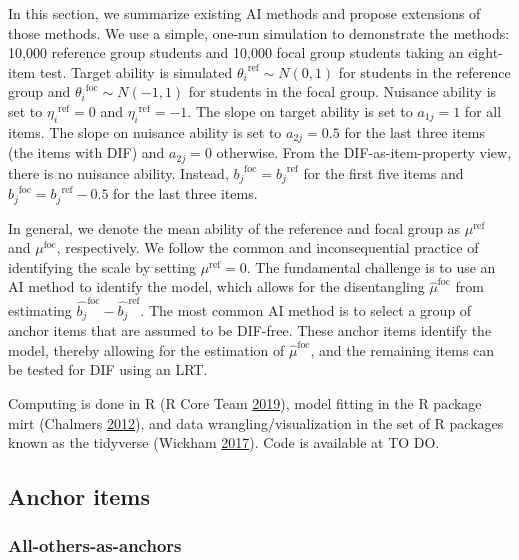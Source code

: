\documentclass[
  11pt,
]{article}
\begin{document}
In this section, we summarize existing AI methods and propose extensions of those methods. We use a simple, one-run simulation to demonstrate the methods: 10,000 reference group students and 10,000 focal group students taking an eight-item test. Target ability is simulated \({\theta_i}^{\text{ref}} \sim N(0,1)\) for students in the reference group and \({\theta_i}^{\text{foc}} \sim N(-1,1)\) for students in the focal group. Nuisance ability is set to \({\eta_i}^{\text{ref}} = 0\) and \({\eta_i}^{\text{ref}} = -1\). The slope on target ability is set to \(a_{1j} = 1\) for all items. The slope on nuisance ability is set to \(a_{2j} = 0.5\) for the last three items (the items with DIF) and \(a_{2j} = 0\) otherwise. From the DIF-as-item-property view, there is no nuisance ability. Instead, \({b_j}^{\text{foc}} = {b_j}^{\text{ref}}\) for the first five items and \({b_j}^{\text{foc}} = {b_j}^{\text{ref}} - 0.5\) for the last three items.

In general, we denote the mean ability of the reference and focal group as \(\mu^\text{ref}\) and \(\mu^\text{foc}\), respectively. We follow the common and inconsequential practice of identifying the scale by setting \(\mu^\text{ref} = 0\). The fundamental challenge is to use an AI method to identify the model, which allows for the disentangling \(\hat\mu^\text{foc}\) from estimating \(\hat{b_j}^{\text{foc}} - \hat{b_j}^{\text{ref}}\). The most common AI method is to select a group of anchor items that are assumed to be DIF-free. These anchor items identify the model, thereby allowing for the estimation of \(\hat\mu^\text{foc}\), and the remaining items can be tested for DIF using an LRT.

Computing is done in R (R Core Team \protect\hyperlink{ref-rcore}{2019}), model fitting in the R package mirt (Chalmers \protect\hyperlink{ref-chalmers2012mirt}{2012}), and data wrangling/visualization in the set of R packages known as the tidyverse (Wickham \protect\hyperlink{ref-tidy}{2017}). Code is available at TO DO.

\hypertarget{anchoritems}{%
\subsection{Anchor items}\label{anchoritems}}

\hypertarget{all-others-as-anchors}{%
\subsubsection{All-others-as-anchors}\label{all-others-as-anchors}}
\end{document}
